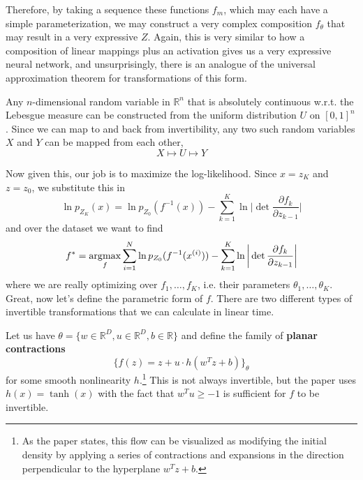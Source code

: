   Therefore, by taking a sequence these functions $f_m$, which may each have a simple parameterization, we may construct a very complex composition $f_\theta$ that may result in a very expressive $Z$. Again, this is very similar to how a composition of linear mappings plus an activation gives us a very expressive neural network, and unsurprisingly, there is an analogue of the universal approximation theorem for transformations of this form. 

  \begin{theorem} 
    Any $n$-dimensional random variable in $\mathbb{R}^n$ that is absolutely continuous w.r.t. the Lebesgue measure can be constructed from the uniform distribution $U$ on $[0, 1]^n$. Since we can map to and back from invertibility, any two such random variables $X$ and $Y$ can be mapped from each other, 
    \begin{equation}
      X \mapsto U \mapsto Y 
    \end{equation}
  \end{theorem} 

  Now given this, our job is to maximize the log-likelihood. Since $x = z_K$ and $z = z_0$, we substitute this in 
  \begin{equation}
    \ln p_{Z_K} (x) = \ln p_{Z_0} (f^{-1}(x)) - \sum_{k=1}^K \ln \bigg| \det \frac{\partial f_k}{\partial z_{k-1}} \bigg| 
  \end{equation} 
  and over the dataset we want to find 
  \begin{equation}
    f^\ast = \argmax_{f} \sum_{i=1}^N \ln p_{Z_0} (f^{-1}(x^{(i)})) - \sum_{k=1}^K \ln \bigg| \det \frac{\partial f_k}{\partial z_{k-1}} \bigg| 
  \end{equation}
  where we are really optimizing over $f_1, \ldots, f_K$, i.e. their parameters $\theta_1, \ldots, \theta_K$. Great, now let's define the parametric form of $f$. There are two different types of invertible transformations that we can calculate in linear time. 

  \begin{definition}
    Let us have $\theta = \{w \in \mathbb{R}^D, u \in \mathbb{R}^D, b \in \mathbb{R}\}$ and define the family of \textbf{planar contractions}
    \begin{equation}
      \{f(z) = z + u \cdot h( w^T z + b)\}_\theta
    \end{equation}
    for some smooth nonlinearity $h$.\footnote{As the paper states, this flow can be visualized as modifying the initial density by applying a series of contractions and expansions in the direction perpendicular to the hyperplane $w^T z + b$.} This is not always invertible, but the paper uses $h(x) = \tanh(x)$ with the fact that $w^T u \geq -1$ is sufficient for $f$ to be invertible. 
  \end{definition} 
  
